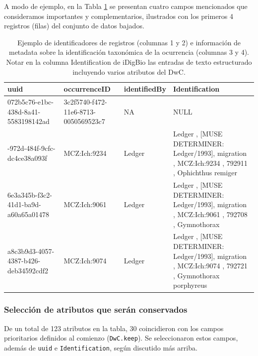 \documentclass[sn-apa,pdflatex]{sn-jnl}
\begin{document}
A modo de ejemplo, en la Tabla \ref{tab:idigbio2} se presentan cuatro
campos mencionados que consideramos importantes y complementarios,
ilustrados con los primeros 4 registros (filas) del conjunto de datos
bajados.

\begingroup\fontsize{7}{9}\selectfont

\begin{longtable}[t]{>{\raggedright\arraybackslash}p{7em}>{\raggedright\arraybackslash}p{7em}>{\raggedright\arraybackslash}p{7em}>{\raggedright\arraybackslash}p{30em}}
\caption{\label{tab:idigbio2}Ejemplo de identificadores de registros (columnas 1 y 2) e información de metadata sobre la identificación taxonómica de la ocurrencia (columnas 3 y 4). Notar en la columna Identification de iDigBio las entradas de texto estructurado incluyendo varios atributos del DwC.}\\
\toprule
uuid & occurrenceID & identifiedBy & Identification\\
\midrule
072b5c76-e1bc-438d-8a41-5583198142ad & 3c2f5740-f472-11e6-8713-0050569523c7 & NA & NULL\\
39467821-972d-484f-9cfc-dc4ce38a093f & MCZ:Ich:9234 & Ledger & Ledger                        , [MUSE DETERMINER: Ledger/1993], migration                     , MCZ:Ich:9234                  , 792911                        , Ophichthus remiger\\
6e3a345b-f3c2-41d1-ba9d-a60a65a01478 & MCZ:Ich:9061 & Ledger & Ledger                        , [MUSE DETERMINER: Ledger/1993], migration                     , MCZ:Ich:9061                  , 792708                        , Gymnothorax\\
a8c3b9d3-4057-4387-b426-deb34592cdf2 & MCZ:Ich:9074 & Ledger & Ledger                        , [MUSE DETERMINER: Ledger/1993], migration                     , MCZ:Ich:9074                  , 792721                        , Gymnothorax porphyreus\\
\bottomrule
\end{longtable}
\endgroup{}

\subsubsection{Selección de atributos que serán
conservados}\label{selecciuxf3n-de-atributos-que-seruxe1n-conservados}

De un total de 123 atributos en la tabla, 30 coincidieron con los campos
prioritarios definidos al comienzo (\texttt{DwC.keep}). Se seleccionaron
estos campos, además de \texttt{uuid} e \texttt{Identification}, según
discutido más arriba.
\end{document}
